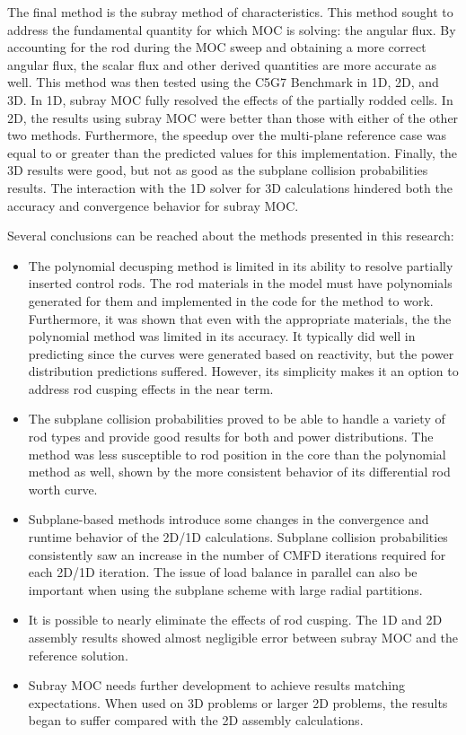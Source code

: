 The final method is the subray method of characteristics.  This method sought to address the fundamental quantity for which MOC is solving: the angular flux.  By accounting for the rod during the MOC sweep and obtaining a more correct angular flux, the scalar flux and other derived quantities are more accurate as well.  This method was then tested using the C5G7 Benchmark in 1D, 2D, and 3D.  In 1D, subray MOC fully resolved the effects of the partially rodded cells.  In 2D, the results using subray MOC were better than those with either of the other two methods.  Furthermore, the speedup over the multi-plane reference case was equal to or greater than the predicted values for this implementation.  Finally, the 3D results were good, but not as good as the subplane collision probabilities results.  The interaction with the 1D solver for 3D calculations hindered both the accuracy and convergence behavior for subray MOC.

Several conclusions can be reached about the methods presented in this research:

\begin{itemize}
    \item The polynomial decusping method is limited in its ability to resolve partially inserted control rods.  The rod materials in the model must have polynomials generated for them and implemented in the code for the method to work.  Furthermore, it was shown that even with the appropriate materials, the the polynomial method was limited in its accuracy.  It typically did well in predicting \keff{} since the curves were generated based on reactivity, but the power distribution predictions suffered.  However, its simplicity makes it an option to address rod cusping effects in the near term.
    
    \item The subplane collision probabilities proved to be able to handle a variety of rod types and provide good results for both \keff{} and power distributions.  The method was less susceptible to rod position in the core than the polynomial method as well, shown by the more consistent behavior of its differential rod worth curve.
    
    \item Subplane-based methods introduce some changes in the convergence and runtime behavior of the 2D/1D calculations.  Subplane collision probabilities consistently saw an increase in the number of CMFD iterations required for each 2D/1D iteration.  The issue of load balance in parallel can also be important when using the subplane scheme with large radial partitions.
    
    \item It is possible to nearly eliminate the effects of rod cusping.  The 1D and 2D assembly results showed almost negligible error between subray MOC and the reference solution.
    
    \item Subray MOC needs further development to achieve results matching expectations.  When used on 3D problems or larger 2D problems, the results began to suffer compared with the 2D assembly calculations.
\end{itemize}

